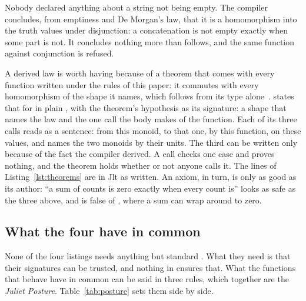 Nobody declared anything about a string not being empty.
The compiler concludes, from emptiness and De Morgan's law, that it is a homomorphism into the truth values under disjunction: a concatenation is not empty exactly when some part is not.
It concludes nothing more than follows, and the same function against conjunction is refused.

A derived law is worth having because of a theorem that comes with every function written under the rules of this paper: it commutes with every homomorphism of the shape it names, which follows from its type alone~\cite{reynolds1983types,wadler1989theorems}.
 states that for  in plain \Cpp{}, with the theorem's hypothesis as its signature: a shape that names the law and the one call the body makes of the function.
Each of its three calls reads as a sentence: from this monoid, to that one, by this function, on these values, and names the two monoids by their units.
The third can be written only because of the fact the compiler derived.
A call checks one case and proves nothing, and the theorem holds whether or not anyone calls it.
The lines of Listing~\ref{lst:theorems} are in Jlt as written.
An axiom, in turn, is only as good as its author: ``a sum of counts is zero exactly when every count is'' looks as safe as the three above, and is false of , where a sum can wrap around to zero.

\subsection{What the four have in common}
\label{sec:examples:common}
\label{sec:posture}

None of the four listings needs anything but standard \Cpp{}.
What they need is that their signatures can be trusted, and nothing in \Cpp{} ensures that.
What the functions that behave have in common can be said in three rules, which together are the \emph{Juliet Posture}.
Table~\ref{tab:posture} sets them side by side.

